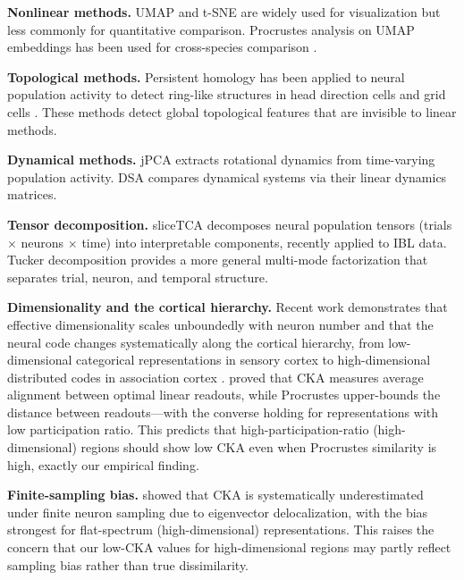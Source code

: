 \documentclass{article}
\begin{document}
\textbf{Nonlinear methods.} UMAP \citep{mcinnes2018umap} and t-SNE \citep{vandermaaten2008visualizing} are widely used for visualization but less commonly for quantitative comparison. Procrustes analysis on UMAP embeddings has been used for cross-species comparison \citep{deitch2021representational}.

\textbf{Topological methods.} Persistent homology has been applied to neural population activity to detect ring-like structures in head direction cells \citep{gardner2022toroidal} and grid cells \citep{rybakken2019decoding}. These methods detect global topological features that are invisible to linear methods.

\textbf{Dynamical methods.} jPCA \citep{churchland2012neural} extracts rotational dynamics from time-varying population activity. DSA \citep{ostrow2023beyond} compares dynamical systems via their linear dynamics matrices.

\textbf{Tensor decomposition.} sliceTCA \citep{pellegrino2024dimensionality} decomposes neural population tensors (trials $\times$ neurons $\times$ time) into interpretable components, recently applied to IBL data. Tucker decomposition \citep{tucker1966some} provides a more general multi-mode factorization that separates trial, neuron, and temporal structure.

\textbf{Dimensionality and the cortical hierarchy.} Recent work demonstrates that effective dimensionality scales unboundedly with neuron number \citep{stringer2024unbounded} and that the neural code changes systematically along the cortical hierarchy, from low-dimensional categorical representations in sensory cortex to high-dimensional distributed codes in association cortex \citep{huntenburg2024categorical}. \citet{harvey2024representational} proved that CKA measures average alignment between optimal linear readouts, while Procrustes upper-bounds the distance between readouts---with the converse holding for representations with low participation ratio. This predicts that high-participation-ratio (high-dimensional) regions should show low CKA even when Procrustes similarity is high, exactly our empirical finding.

\textbf{Finite-sampling bias.} \citet{spectral2025neurips} showed that CKA is systematically underestimated under finite neuron sampling due to eigenvector delocalization, with the bias strongest for flat-spectrum (high-dimensional) representations. This raises the concern that our low-CKA values for high-dimensional regions may partly reflect sampling bias rather than true dissimilarity.
\end{document}
